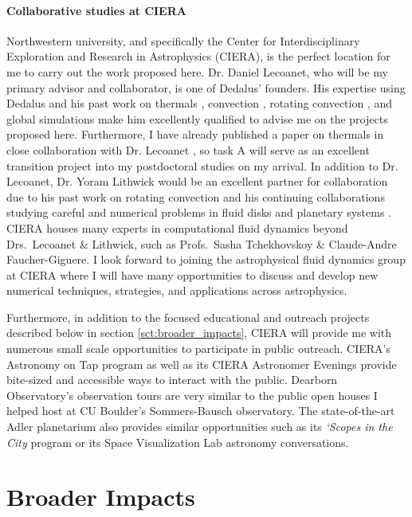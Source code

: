\documentclass[11pt, preprint]{aastex}
\begin{document}
\paragraph{Collaborative studies at CIERA}
\label{sct:ciera}
Northwestern university, and specifically the Center for Interdisciplinary Exploration and Research in Astrophysics (CIERA), is the perfect location for me to carry out the work proposed here.
Dr. Daniel Lecoanet, who will be my primary advisor and collaborator, is one of Dedalus' founders.
His expertise using Dedalus and his past work on thermals \citep{lecoanet&jeevanjee2019, tarshis&all2018}, convection \citep{lecoanet&quataert2013, lecoanet&all2014, couston&all2017}, rotating convection \citep{couston&all2019}, and global simulations \citep{lecoanet&all2018} make him excellently qualified to advise me on the projects proposed here.
Furthermore, I have already published a paper on thermals in close collaboration with Dr. Lecoanet \citep{andersLB2019}, so task A will serve as an excellent transition project into my postdoctoral studies on my arrival.
In addition to Dr. Lecoanet, Dr. Yoram Lithwick would be an excellent partner for collaboration due to his past work on rotating convection \citep{BDLithwick2014} and his continuing collaborations studying careful and numerical problems in fluid disks \citep{LDLithwick2019} and planetary systems \citep{hadden&lithwick2018}.
CIERA houses many experts in computational fluid dynamics beyond Drs.~Lecoanet \& Lithwick, such as Profs.~Sasha Tchekhovskoy \& Claude-Andre Faucher-Giguere.
I look forward to joining the astrophysical fluid dynamics group at CIERA where I will have many opportunities to discuss and develop new numerical techniques, strategies, and applications across astrophysics.


Furthermore, in addition to the focused educational and outreach projects described below in section \ref{sct:broader_impacts}, CIERA will provide me with numerous small scale opportunities to participate in public outreach.
CIERA's Astronomy on Tap program as well as its CIERA Astronomer Evenings provide bite-sized and accessible ways to interact with the public.
Dearborn Observatory's observation tours are very similar to the public open houses I helped host at CU Boulder's Sommers-Bausch observatory.
The state-of-the-art Adler planetarium also provides similar opportunities such as its \emph{`Scopes in the City} program or its Space Visualization Lab astronomy conversations.


\section{Broader Impacts}
\vspace{-6pt}
\label{sct:broader_impacts}
\end{document}
